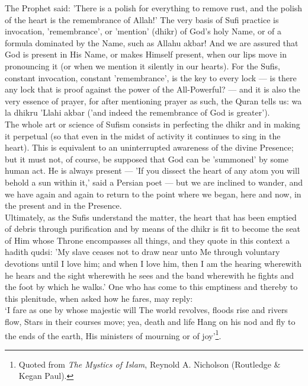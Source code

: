 \documentclass[10pt, twoside]{book}
\begin{document}
The Prophet said: 'There is a polish for everything to remove rust, and the polish of the heart is 
the remembrance of Allah!' The very basis of Sufi practice is invocation, 'remembrance', or 'mention' 
(dhikr) of God's holy Name, or of a formula dominated by the Name, such as Allahu akbar! And we are 
assured that God is present in His Name, or makes Himself present, when our lips move in pronouncing 
it (or when we mention it silently in our hearts). For the Sufis, constant invocation, constant 
'remembrance', is the key to every lock --- is there any lock that is proof against the power of the 
All-Powerful? --- and it is also the very essence of prayer, for after mentioning prayer as such, the 
Quran tells us: wa la dhikru 'Llahi akbar ('and indeed the remembrance of God is greater'). \\

The whole art or science of Sufism consists in perfecting the dhikr and in making it perpetual (so 
that even in the midst of activity it continues to sing in the heart). This is equivalent to an 
uninterrupted awareness of the divine Presence; but it must not, of course, be supposed that God can 
be 'summoned' by some human act. He is always present --- 'If you dissect the heart of any atom you 
will behold a sun within it,' said a Persian poet --- but we are inclined to wander, and we have again 
and again to return to the point where we began, here and now, in the present and in the Presence. \\

Ultimately, as the Sufis understand the matter, the heart that has been emptied of debris through 
purification and by means of the dhikr is fit to become the seat of Him whose Throne encompasses all 
things, and they quote in this context a hadith qudsi: 'My slave ceases not to draw near unto Me 
through voluntary devotions until I love him; and when I love him, then I am the hearing wherewith he 
hears and the sight wherewith he sees and the band wherewith he fights and the foot by which he 
walks.' One who has come to this emptiness and thereby to this plenitude, when asked how he fares, 
may reply: \\

`I fare as one by whose majestic will The world revolves, floods rise and rivers flow, Stars in their 
courses move; yea, death and life Hang on his nod and fly to the ends of the earth, His ministers of 
mourning or of joy'\footnote{Quoted from \emph{The Mystics of Islam}, Reynold A. Nicholson (Routledge \& Kegan Paul).}.\\
\end{document}
